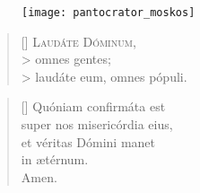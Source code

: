 \documentclass[omni.tex]{subfiles}
\begin{document}
\begin{figure}
{\begin{center}
    \texttt{[image: pantocrator\_moskos]}
\end{center}}
\end{figure}

\settowidth{\versewidth}{Et ne nos ind\'ucas in tentati\'onem}

\begin{verse}[\versewidth]
\lettrine[lhang=1.0,nindent=0em]{L}{aud\'ate D\'ominum}, \\> 
omnes gentes; \\>
laud\'ate eum, omnes p\'opuli.
\end{verse}

\begin{verse}[\versewidth]
Qu\'oniam confirm\'ata est \\
super nos miseric\'ordia eius, \\
et v\'eritas D\'omini manet \\
in \ae t\'ernum. \\
Amen. \\[6\baselineskip]
\end{verse}

\pagebreak
\end{document}
